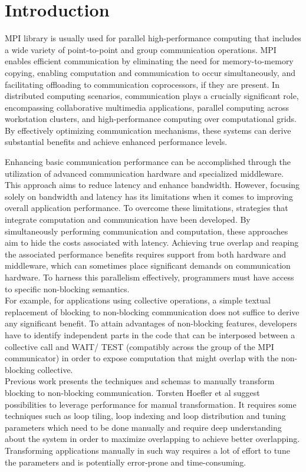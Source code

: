 \section{Introduction}
MPI \cite{noauthor_mpi_nodate} library is usually used for parallel high-performance computing that includes a wide variety of point-to-point and group communication operations. MPI enables efficient communication by eliminating the need for memory-to-memory copying, enabling computation and communication to occur simultaneously, and facilitating offloading to communication coprocessors, if they are present. 
In distributed computing scenarios, communication plays a crucially significant role, encompassing collaborative multimedia applications, parallel computing across workstation clusters, and high-performance computing over computational grids. By effectively optimizing communication mechanisms, these systems can derive substantial benefits and achieve enhanced performance levels. 

Enhancing basic communication performance can be accomplished through the utilization of advanced communication hardware and specialized middleware. This approach aims to reduce latency and enhance bandwidth. However, focusing solely on bandwidth and latency has its limitations when it comes to improving overall application performance. To overcome these limitations, strategies that integrate computation and communication have been developed. By simultaneously performing communication and computation, these approaches aim to hide the costs associated with latency. Achieving true overlap and reaping the associated performance benefits requires support from both hardware and middleware, which can sometimes place significant demands on communication hardware. To harness this parallelism effectively, programmers must have access to specific non-blocking semantics. \cite{hoefler_leveraging_2008}\\
For example, for applications using collective operations, a simple textual replacement of blocking to non-blocking communication does not suffice to derive any significant benefit. To attain advantages of non-blocking features, developers have to identify independent parts in the code that can be interposed between a collective call and WAIT/ TEST (compatibly across the group of the MPI communicator) in order to expose computation that might overlap with the non-blocking collective.\\
Previous work \cite{calland_tiling_1999}\cite{danalis_transformations_2005}\cite{baude_optimizing_2001} presents  the techniques and schemas to manually transform blocking to non-blocking communication. Torsten Hoefler \cite{hoefler_leveraging_2008} et al suggest possibilities to leverage performance for manual transformation. It requires some techniques such as loop tiling, loop indexing and loop distribution and tuning parameters which need to be done manually and require deep understanding about the system in order to maximize overlapping to achieve better overlapping. Transforming applications manually in such way requires a lot of effort to tune the parameters and is potentially error-prone and time-consuming.\cite{sancho_mpi_2006}

